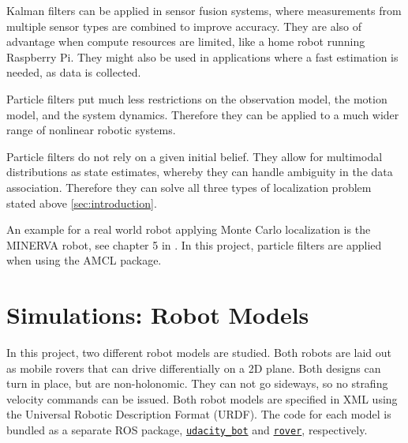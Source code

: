 \documentclass[10pt,journal,compsoc]{IEEEtran}
\begin{document}
Kalman filters can be applied in sensor fusion systems, where measurements from multiple sensor types are combined to improve accuracy. They are also of advantage when compute resources are limited, like a home robot running Raspberry Pi. They might also be used in applications where a fast estimation is needed, as data is collected. 

Particle filters put much less restrictions on the observation model, the motion model, and the system dynamics. Therefore they can be applied to a much wider range of nonlinear robotic systems.

Particle filters do not rely on a given initial belief. They allow for multimodal distributions as state estimates, whereby they can handle ambiguity in the data association. Therefore they can solve all three types of localization problem stated above \ref{sec:introduction}.

An example for a real world robot applying Monte Carlo localization is the MINERVA robot, see chapter 5 in \cite{monte_carlo_for_mobile_robots}. In this project, particle filters are applied when using the AMCL package.

\section{Simulations: Robot Models}
\label{sec:simulations_robot_models}
In this project, two different robot models are studied. Both robots are laid out as mobile rovers that can drive differentially on a 2D plane. Both designs can turn in place, but are non-holonomic. They can not go sideways, so no strafing velocity commands can be issued. Both robot models are specified in XML using the Universal Robotic Description Format (URDF). The code for each model is bundled as a separate ROS package, \href{https://github.com/S2H-Mobile/RoboND-Localization-Project/tree/master/udacity_bot}{\texttt{udacity\_bot}} and \href{https://github.com/S2H-Mobile/RoboND-Localization-Project/tree/master/rover}{\texttt{rover}}, respectively.
\end{document}
